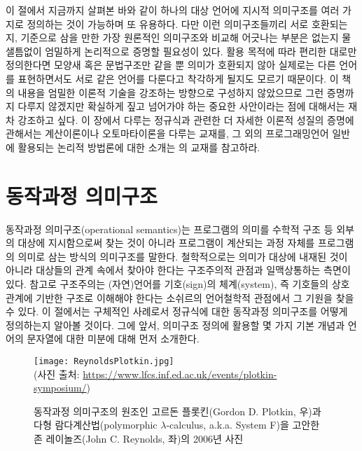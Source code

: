 이 절에서 지금까지 살펴본 바와 같이 하나의 대상 언어에 지시적 의미구조를
여러 가지로 정의하는 것이 가능하며 또 유용하다. 다만 이런 의미구조들끼리
서로 호환되는지, 기준으로 삼을 만한 가장 원론적인 의미구조와 비교해
어긋나는 부분은 없는지 물샐틈없이 엄밀하게 논리적으로 증명할 필요성이 있다.
활용 목적에 따라 편리한 대로만 정의한다면 모양새 혹은
문법구조만 같을 뿐 의미가 호환되지 않아 실제로는 다른 언어를 표현하면서도
서로 같은 언어를 다룬다고 착각하게 될지도 모르기 때문이다. 이 책의 내용을
엄밀한 이론적 기술을 강조하는 방향으로 구성하지 않았으므로 그런 증명까지
다루지 않겠지만 확실하게 짚고 넘어가야 하는 중요한 사안이라는 점에 대해서는
재차 강조하고 싶다. 이 장에서 다루는 정규식과 관련한 더 자세한 이론적
성질의 증명에 관해서는 계산이론이나 오토마타이론을 다루는
교재\cite{Sipser2013,Hopcroft2007}를, 그 외의 프로그래밍언어 일반에
활용되는 논리적 방법론에 대한 소개는 \citet{PFPL2nd}의 교재를 참고하라.


\section{동작과정 의미구조}
%
%
%
%
동작과정 의미구조(operational semantics)\cite{Plotkin1981sos}는
프로그램의 의미를 수학적 구조 등 외부의 대상에 지시함으로써 찾는 것이
아니라 프로그램이 계산되는 과정 자체를 프로그램의 의미로 삼는 방식의
의미구조를 말한다. 철학적으로는 의미가 대상에 내재된 것이 아니라 대상들의
관계 속에서 찾아야 한다는 구조주의적 관점과 일맥상통하는 측면이 있다.
참고로 구조주의는 (자연)언어를 기호(sign)의 체계(system), 즉 기호들의
상호관계에 기반한 구조로 이해해야 한다는 소쉬르\cite{Saussure1916}의
언어철학적 관점에서 그 기원을 찾을 수 있다. 이 절에서는 구체적인
사례로서 정규식에 대한 동작과정 의미구조를 어떻게 정의하는지 알아볼
것이다. 그에 앞서, 의미구조 정의에 활용할 몇 가지 기본 개념과
언어의 문자열에 대한 미분에 대해 먼저 소개한다.

\begin{figure}\centering
\texttt{[image: ReynoldsPlotkin.jpg]}\\
{\footnotesize(사진 출처:
\url{https://www.lfcs.inf.ed.ac.uk/events/plotkin-symposium/})}
\caption{동작과정 의미구조의 원조인 고르돈 플롯킨(Gordon D. Plotkin, 우)과
다형 람다계산법(polymorphic $\lambda$-calculus, a.k.a. System F)을
고안한 존 레이놀즈(John C. Reynolds, 좌)의 2006년 사진}
\end{figure}

